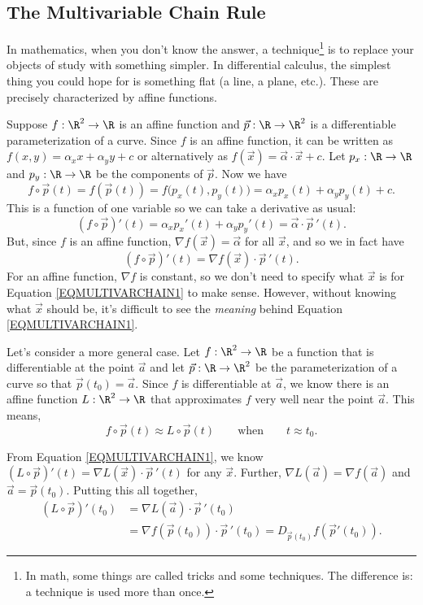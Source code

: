 \subsection{The Multivariable Chain Rule}

In mathematics, when you don't know the answer, a technique\footnote{
In math, some things are called tricks and some techniques.  The difference is:
a technique is used more than once.} is to
replace your objects of study with something simpler.  In differential calculus,
the simplest thing you could hope for is something flat (a line, a plane, etc.).
These are precisely characterized by affine functions.

Suppose $f:\R^2\to\R$ is an affine function and $\vec p:\R\to\R^2$ is a differentiable
parameterization of a curve.  Since $f$ is an affine function, it can be written
as $f(x,y)=\alpha_x x+\alpha_y y+c$ or alternatively as
$f(\vec x) = \vec \alpha\cdot \vec x+c$.  Let $p_x:\R\to\R$ and $p_y:\R\to\R$ be the components
of $\vec p$.  Now we have
\[
	f\circ \vec p(t) = f(\vec p(t)) = f\big(p_x(t),p_y(t)\big)=\alpha_xp_x(t)+\alpha_yp_y(t)+c.
\]
This is a function of one variable so we can take a derivative as usual:
\[
	(f\circ\vec p)'(t) = \alpha_xp_x'(t)+\alpha_yp_y'(t) = \vec \alpha\cdot \vec p\,'(t).
\]
But, since $f$ is an affine function, $\nabla f(\vec x)=\vec \alpha$ for
all $\vec x$, and so we in fact have
\begin{equation}
	\label{EQMULTIVARCHAIN1}
	(f\circ\vec p)'(t) = \nabla f(\vec x)\cdot \vec p\,'(t).
\end{equation}
For an affine function, $\nabla f$ is constant, so we don't need to specify what
$\vec x$ is for Equation \eqref{EQMULTIVARCHAIN1} to make sense.  However, without
knowing what $\vec x$ should be, it's difficult to see the \emph{meaning} behind
Equation \eqref{EQMULTIVARCHAIN1}.

Let's consider a more general case.  Let $f:\R^2\to\R$ be a
function that is differentiable at the point $\vec a$
and let $\vec p:\R\to\R^2$ be the parameterization of a curve so that
$\vec p(t_0)=\vec a$.
Since $f$ is differentiable at $\vec a$, we know there is an affine
function $L:\R^2\to\R$ that approximates $f$ very well near the point $\vec a$.
This means, 
\[
	f\circ \vec p(t) \approx L\circ \vec p(t)\qquad\text{when}\qquad t\approx t_0.
\]

From Equation \eqref{EQMULTIVARCHAIN1}, we know $(L\circ \vec p)'(t)=\nabla L(\vec x)\cdot
\vec p\,'(t)$ for any $\vec x$.  Further, $\nabla L(\vec a)=\nabla f(\vec a)$ and $\vec a=
\vec p(t_0)$.  Putting this all together,
\begin{align*}
	(L\circ \vec p)'(t_0) &= \nabla L(\vec a)\cdot \vec p\,'(t_0)\\
	&=\nabla f(\vec p(t_0))\cdot \vec p\,'(t_0) = D_{\vec p(t_0)} f(\vec p'(t_0)).
\end{align*}

